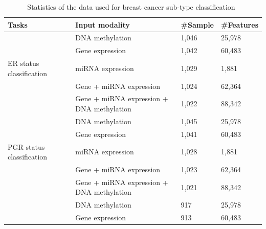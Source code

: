 \begin{table}[h]
    \scriptsize
    \caption{Statistics of the data used for breast cancer sub-type classification~\cite{karimACCESS2019}}
    	\vspace{-2mm}
    \label{tab:all_data_brca}
    \centering
    \begin{tabular}{l|l|l|l} 

        \hline
        \textbf{Tasks}   & \textbf{Input modality} & \textbf{\#Sample } & \textbf{\#Features}  \\ 
        \hline
             & DNA methylation  & 1,046  & 25,978  \\ 
        \cline{2-4}
               & Gene expression   & 1,042 & 60,483      \\ 
        \cline{2-4}
        ER status classification       & miRNA expression                           & 1,029                & 1,881       \\ 
        \cline{2-4}
                                       & Gene + miRNA expression                   & 1,024                & 62,364      \\ 
        \cline{2-4}
                                       & Gene + miRNA expression + DNA methylation & 1,022                & 88,342      \\ 
        \hline
                                       & DNA methylation                           & 1,045                & 25,978      \\ 
        \cline{2-4}
                                       & Gene expression                           & 1,041                & 60,483      \\ 
        \cline{2-4}
        PGR status classification      & miRNA expression                           & 1,028                & 1,881       \\ 
        \cline{2-4}
                                       & Gene + miRNA expression                   & 1,023                & 62,364      \\ 
        \cline{2-4}
                                       & Gene + miRNA expression + DNA methylation & 1,021                & 88,342      \\ 
        \hline
                                       & DNA methylation                           & 917                  & 25,978      \\ 
        \cline{2-4}
                                       & Gene expression                           & 913                  & 60,483      \\ 

\end{tabular}
\end{table}
